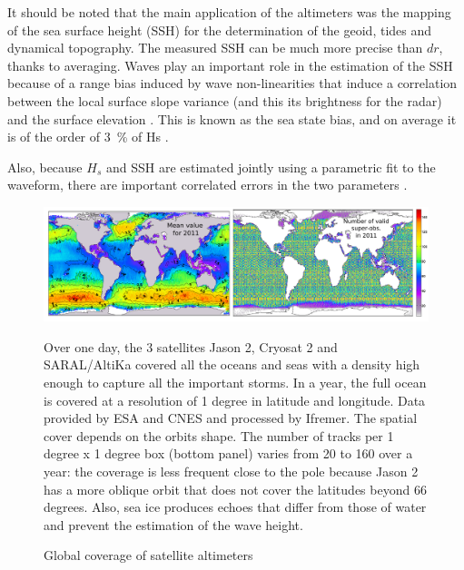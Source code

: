 It should be noted that the main application of the altimeters was the mapping of the sea surface height (SSH) for the determination of the geoid, tides and dynamical topography. The measured
 SSH can be much more precise than $dr$, thanks to averaging. Waves play an important role in the estimation of the SSH because of a range bias induced by wave non-linearities that induce a correlation between the local surface slope variance (and this its brightness for the radar) and the surface elevation \citep{Jackson1979,Srokosz1986}. This is known as 
 the sea state bias, and on average it is of the order of
 3~\% of Hs \citep[e.g.][]{Minster&al.1992}. 
 
 Also, because $H_s$ and SSH are estimated jointly using a parametric fit to the waveform, there are important correlated errors in the two parameters \citep[e.g.][]{Dibarboure&al.2014,DeCarlo&al.2023}. 
\begin{figure}[htb]
\centerline{\includegraphics[width=\textwidth]{FIGS_CH_SAT/altimetre_cartes2011.pdf}}
  \caption{Global coverage of satellite altimeters}
    {Over one day, the 3 satellites Jason 2, Cryosat 2 and SARAL/AltiKa covered all the oceans and seas with a density high enough to capture all the 
important storms. In a year, the full ocean is covered at a resolution of 1 degree in latitude and longitude.  
 Data provided by ESA and CNES and processed by Ifremer. The spatial 
cover depends on the orbits shape. The number of tracks per 1 degree x 1 degree box (bottom panel) varies
from 20 to 160 over a year: the coverage is less frequent close to the pole because Jason 2 has a more oblique orbit that does not cover the 
latitudes beyond 66 degrees. Also, sea ice  produces echoes that differ from those of water and prevent the estimation of the wave height.} 
\label{fig:altimeter_coverage}
\end{figure}



